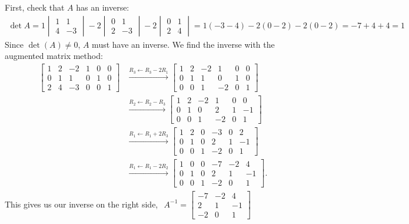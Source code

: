 \begin{Answer}[ref={ex:inverse2}]

First, check that $A$ has an inverse:
$$\begin{array}{c} \det A
=1\begin{vmatrix}1&1\\[4pt]4&-3\end{vmatrix}
-2\begin{vmatrix}0&1\\[4pt]2&-3\end{vmatrix}
-2\begin{vmatrix}0&1\\[4pt]2&4\end{vmatrix}
=1(-3-4)-2(0-2)-2(0-2)=-7+4+4=1 \end{array}$$
Since $\det(A) \ne 0$, $A$ must have an inverse. We find the inverse with the augmented matrix method:
\begin{align*}
\left[\begin{array}{ccc|ccc}
1 & 2 & -2 & 1 & 0 & 0\\
0 & 1 & 1  & 0 & 1 & 0\\
2 & 4 & -3 & 0 & 0 & 1
\end{array}\right]
&\xrightarrow{R_3 \leftarrow R_3 - 2R_1}
\left[\begin{array}{ccc|ccc}
1 & 2 & -2 & 1 & 0 & 0\\
0 & 1 & 1  & 0 & 1 & 0\\
0 & 0 & 1  & -2 & 0 & 1
\end{array}\right] \\[10pt]
&\xrightarrow{R_2 \leftarrow R_2 - R_3}
\left[\begin{array}{ccc|ccc}
1 & 2 & -2 & 1 & 0 & 0\\
0 & 1 & 0  & 2 & 1 & -1\\
0 & 0 & 1  & -2 & 0 & 1
\end{array}\right] \\[10pt]
&\xrightarrow{R_1 \leftarrow R_1 + 2R_3}
\left[\begin{array}{ccc|ccc}
1 & 2 & 0 & -3 & 0 & 2\\
0 & 1 & 0 & 2 & 1 & -1\\
0 & 0 & 1 & -2 & 0 & 1
\end{array}\right] \\[10pt]
&\xrightarrow{R_1 \leftarrow R_1 - 2R_2}
\left[\begin{array}{ccc|ccc}
1 & 0 & 0 & -7 & -2 & 4\\
0 & 1 & 0 & 2 & 1 & -1\\
0 & 0 & 1 & -2 & 0 & 1
\end{array}\right].
\end{align*}
This gives us our inverse on the right side, $\begin{array}{c} A^{-1}
=
\begin{bmatrix}
-7 & -2 & 4\\
2 & 1 & -1\\
-2 & 0 & 1
\end{bmatrix} \end{array}$


\end{Answer}
